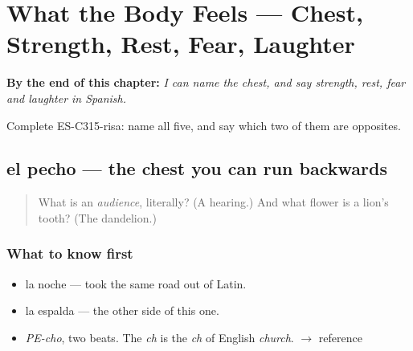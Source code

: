 
\chapter{What the Body Feels --- Chest, Strength, Rest, Fear, Laughter}
\label{ch:fuerza-y-risa}

\begin{chapteropening}
\textbf{By the end of this chapter:} \emph{I can name the chest, and say strength, rest, fear and laughter in Spanish.}

Complete ES-C315-risa: name all five, and say which two of them are opposites.
\end{chapteropening}

\section[el pecho]{el pecho — the chest you can run backwards}

\label{lesson:ES-C315-pecho}



\begin{quote}
What is an \emph{audience}, literally? (A hearing.) And what flower is a lion's tooth? (The dandelion.)
\end{quote}

\subsection*{What to know first}
\begin{itemize}
\raggedright
  \item la noche — took the same road out of Latin.
  \item la espalda — the other side of this one.
\end{itemize}

\begin{sounds}
\begin{itemize}
\raggedright
  \item \emph{PE-cho}, two beats. The \emph{ch} is the \emph{ch} of English \emph{church}. $\to$ reference
\end{itemize}
\end{sounds}

